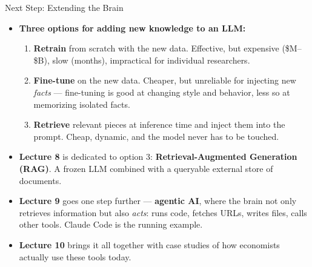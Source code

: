 \begin{frame}{Next Step: Extending the Brain}
\begin{itemize}
\item \textbf{Three options for adding new knowledge to an LLM:}
\begin{enumerate}
    \item \textbf{Retrain} from scratch with the new data. Effective, but expensive (\$M--\$B), slow (months), impractical for individual researchers.
    \medskip
    \item \textbf{Fine-tune} on the new data. Cheaper, but unreliable for injecting new \emph{facts} --- fine-tuning is good at changing style and behavior, less so at memorizing isolated facts.
    \medskip
    \item \textbf{Retrieve} relevant pieces at inference time and inject them into the prompt. Cheap, dynamic, and the model never has to be touched.
\end{enumerate}

\medskip
\item \textbf{Lecture 8} is dedicated to option 3: \textbf{Retrieval-Augmented Generation (RAG)}. A frozen LLM combined with a queryable external store of documents.

\medskip
\item \textbf{Lecture 9} goes one step further --- \textbf{agentic AI}, where the brain not only retrieves information but also \emph{acts}: runs code, fetches URLs, writes files, calls other tools. Claude Code is the running example.

\medskip
\item \textbf{Lecture 10} brings it all together with case studies of how economists actually use these tools today.
\end{itemize}
\end{frame}

